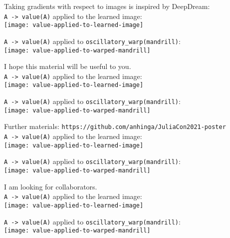 \documentclass{beamer}
\newcommand{\msmagenta}[1]{{\color{mymagenta} #1}}
\begin{document}
\begin{frame}

Taking gradients with respect to images is inspired by \msmagenta{DeepDream}:\\[2ex]

{\footnotesize\tt A -> value(A)} applied to the learned image:\\[2ex]

\texttt{[image: value-applied-to-learned-image]}

{\footnotesize\tt A -> value(A)} applied to \msmagenta{\footnotesize\tt oscillatory\_warp(mandrill)}:\\[2ex]

\texttt{[image: value-applied-to-warped-mandrill]}
\end{frame}

\begin{frame}

I hope this material will be useful to you.\\[2ex]

{\footnotesize\tt A -> value(A)} applied to the learned image:\\[2ex]

\texttt{[image: value-applied-to-learned-image]}

{\footnotesize\tt A -> value(A)} applied to \msmagenta{\footnotesize\tt oscillatory\_warp(mandrill)}:\\[2ex]

\texttt{[image: value-applied-to-warped-mandrill]}
\end{frame}

\begin{frame}

Further materials: {\footnotesize\tt https://github.com/anhinga/JuliaCon2021-poster}\\[2ex]

{\footnotesize\tt A -> value(A)} applied to the learned image:\\[2ex]

\texttt{[image: value-applied-to-learned-image]}

{\footnotesize\tt A -> value(A)} applied to \msmagenta{\footnotesize\tt oscillatory\_warp(mandrill)}:\\[2ex]

\texttt{[image: value-applied-to-warped-mandrill]}
\end{frame}

\begin{frame}

\msmagenta{I am looking for collaborators.}\\[2ex]

{\footnotesize\tt A -> value(A)} applied to the learned image:\\[2ex]

\texttt{[image: value-applied-to-learned-image]}

{\footnotesize\tt A -> value(A)} applied to \msmagenta{\footnotesize\tt oscillatory\_warp(mandrill)}:\\[2ex]

\texttt{[image: value-applied-to-warped-mandrill]}
\end{frame}
\end{document}
